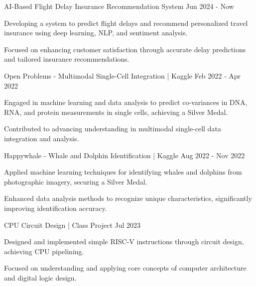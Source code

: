 \begin{cventries}
  \cventry
    {AI-Based Flight Delay Insurance Recommendation System} %
    {Jun 2024 - Now} %
    {
      \begin{cvitems} %
        \item {Developing a system to predict flight delays and recommend personalized travel insurance using deep learning, NLP, and sentiment analysis.}
        \item {Focused on enhancing customer satisfaction through accurate delay predictions and tailored insurance recommendations.}
      \end{cvitems}
    }

  \cventry
    {Open Problems - Multimodal Single-Cell Integration | Kaggle} %
    {Feb 2022 - Apr 2022} %
    {
      \begin{cvitems} %
        \item {Engaged in machine learning and data analysis to predict co-variances in DNA, RNA, and protein measurements in single cells, achieving a Silver Medal.}
        \item {Contributed to advancing understanding in multimodal single-cell data integration and analysis.}
      \end{cvitems}
    }

  \cventry
    {Happywhale - Whale and Dolphin Identification | Kaggle} %
    {Aug 2022 - Nov 2022} %
    {
      \begin{cvitems} %
        \item {Applied machine learning techniques for identifying whales and dolphins from photographic imagery, securing a Silver Medal.}
        \item {Enhanced data analysis methods to recognize unique characteristics, significantly improving identification accuracy.}
      \end{cvitems}
    }

  \cventry
    {CPU Circuit Design | Class Project} %
    {Jul 2023} %
    {
      \begin{cvitems} %
        \item {Designed and implemented simple RISC-V instructions through circuit design, achieving CPU pipelining.}
        \item {Focused on understanding and applying core concepts of computer architecture and digital logic design.}
      \end{cvitems}
    }

\end{cventries}
